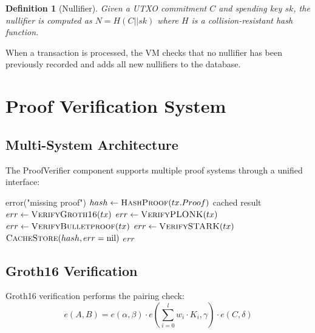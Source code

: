 \documentclass[11pt,a4paper]{article}
\newtheorem{definition}{Definition}
\begin{document}
\begin{definition}[Nullifier]
Given a UTXO commitment $C$ and spending key $sk$, the nullifier is computed as $N = H(C || sk)$ where $H$ is a collision-resistant hash function.
\end{definition}

When a transaction is processed, the VM checks that no nullifier has been previously recorded and adds all new nullifiers to the database.

\section{Proof Verification System}

\subsection{Multi-System Architecture}

The ProofVerifier component supports multiple proof systems through a unified interface:

\begin{algorithm}
\caption{Transaction Proof Verification}
\begin{algorithmic}[1]
        \State \Return error("missing proof")
    \EndIf
    \State $hash \gets \Call{HashProof}{tx.Proof}$
        \State \Return cached result
    \EndIf
            \State $err \gets \Call{VerifyGroth16}{tx}$
        \EndCase
            \State $err \gets \Call{VerifyPLONK}{tx}$
        \EndCase
            \State $err \gets \Call{VerifyBulletproof}{tx}$
        \EndCase
            \State $err \gets \Call{VerifySTARK}{tx}$
        \EndCase
    \EndSwitch
    \State $\Call{CacheStore}{hash, err = \text{nil}}$
    \State \Return $err$
\EndProcedure
\end{algorithmic}
\end{algorithm}

\subsection{Groth16 Verification}

Groth16 verification performs the pairing check:
\[
e(A, B) = e(\alpha, \beta) \cdot e\left(\sum_{i=0}^{l} w_i \cdot K_i, \gamma\right) \cdot e(C, \delta)
\]
\end{document}
